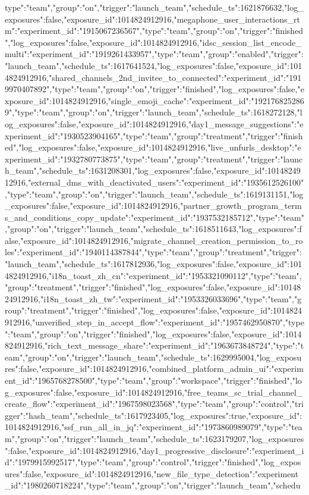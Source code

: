 {type":"team","group":"on","trigger":"launch_team","schedule_ts":1621876632,"log_exposures":false,"exposure_id":1014824912916},"megaphone_user_interactions_rtm":{"experiment_id":"1915067236567","type":"team","group":"on","trigger":"finished","log_exposures":false,"exposure_id":1014824912916},"idsc_session_list_encode_multi":{"experiment_id":"1919261433957","type":"team","group":"enabled","trigger":"launch_team","schedule_ts":1617641524,"log_exposures":false,"exposure_id":1014824912916},"shared_channels_2nd_invitee_to_connected":{"experiment_id":"1919970407892","type":"team","group":"on","trigger":"finished","log_exposures":false,"exposure_id":1014824912916},"single_emoji_cache":{"experiment_id":"1921768252869","type":"team","group":"on","trigger":"launch_team","schedule_ts":1618272128,"log_exposures":false,"exposure_id":1014824912916},"day1_message_suggestions":{"experiment_id":"1930523904165","type":"team","group":"treatment","trigger":"finished","log_exposures":false,"exposure_id":1014824912916},"live_unfurls_desktop":{"experiment_id":"1932780773875","type":"team","group":"treatment","trigger":"launch_team","schedule_ts":1631208301,"log_exposures":false,"exposure_id":1014824912916},"external_dms_with_deactivated_users":{"experiment_id":"1935612526100","type":"team","group":"on","trigger":"launch_team","schedule_ts":1619131151,"log_exposures":false,"exposure_id":1014824912916},"partner_growth_program_terms_and_conditions_copy_update":{"experiment_id":"1937532185712","type":"team","group":"on","trigger":"launch_team","schedule_ts":1618511643,"log_exposures":false,"exposure_id":1014824912916},"migrate_channel_creation_permission_to_roles":{"experiment_id":"1940114387844","type":"team","group":"treatment","trigger":"launch_team","schedule_ts":1617812936,"log_exposures":false,"exposure_id":1014824912916},"i18n_toast_zh_cn":{"experiment_id":"1953321090112","type":"team","group":"treatment","trigger":"finished","log_exposures":false,"exposure_id":1014824912916},"i18n_toast_zh_tw":{"experiment_id":"1953326033696","type":"team","group":"treatment","trigger":"finished","log_exposures":false,"exposure_id":1014824912916},"unverified_step_in_accept_flow":{"experiment_id":"1957462950870","type":"team","group":"on","trigger":"finished","log_exposures":false,"exposure_id":1014824912916},"rich_text_message_share":{"experiment_id":"1963673848724","type":"team","group":"on","trigger":"launch_team","schedule_ts":1629995004,"log_exposures":false,"exposure_id":1014824912916},"combined_platform_admin_ui":{"experiment_id":"1965768278500","type":"team","group":"workspace","trigger":"finished","log_exposures":false,"exposure_id":1014824912916},"free_teams_sc_trial_channel_create_flow":{"experiment_id":"1967598023568","type":"team","group":"control","trigger":"hash_team","schedule_ts":1617923405,"log_exposures":true,"exposure_id":1014824912916},"ssf_run_all_in_jq":{"experiment_id":"1973860989079","type":"team","group":"on","trigger":"launch_team","schedule_ts":1623179207,"log_exposures":false,"exposure_id":1014824912916},"day1_progressive_disclosure":{"experiment_id":"1979915992517","type":"team","group":"control","trigger":"finished","log_exposures":false,"exposure_id":1014824912916},"new_file_type_detection":{"experiment_id":"1980260718224","type":"team","group":"on","trigger":"launch_team","schedu}
